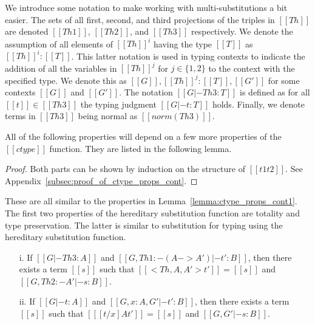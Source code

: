 We introduce some notation to make working with multi-substitutions a
bit easier.  The sets of all first, second, and third projections of
the triples in $[[Th]]$ are denoted $[[Th 1]]$, $[[Th 2]]$, and $[[Th
3]]$ respectively.  We denote the assumption of all elements of
$[[Th]]^i$ having the type $[[T]]$ as $[[Th]]^i : [[T]]$. This latter
notation is used in typing contexts to indicate the addition of all the
variables in $[[Th]]^j$ for $j \in \{1,2\}$ to the context with the
specified type.  We denote this as $[[G]],[[Th]]^j : [[T]],[[G']]$ for
some contexts $[[G]]$ and $[[G']]$.  The notation $[[G |- Th 3 : T]]$
is defined as for all $[[t]] \in [[Th 3]]$ the typing judgment $[[G |-
t : T]]$ holds.  Finally, we denote terms in $[[Th 3]]$ being normal
as $[[norm(Th 3)]]$.

All of the following properties will depend on a few more 
properties of the $[[ctype]]$ function.  They are listed in 
the following lemma.
\begin{proof}
  Both parts can be shown by induction on the structure of $[[t1 t2]]$.  
  See Appendix~\ref{subsec:proof_of_ctype_props_cont}.
\end{proof}
These are all similar to the properties in Lemma~\ref{lemma:ctype_props_cont1}.
The first two properties of the hereditary substitution function are
totality and type preservation.  The latter is similar to substitution
for typing using the hereditary substitution function.
\begin{lemma}
  \label{lemma:totality_and_type_preservation}
  \begin{itemize}
  \item[]
  \item[i.] If $[[G |- Th 3 : A]]$ and $[[G, Th 1:{-(A->A')} |- t' : B]]$, then there
    exists a term $[[s]]$ such that $[[<Th,A,A'>t']] = [[s]]$ and $[[G, Th 2 :{-A'} |- s : B]]$.
  
  \item[ii.] If $[[G |- t : A]]$ and $[[G, x:A, G' |- t':B]]$, then there exists a term $[[s]]$ 
    such that $[[ [t/x] A t']] = [[s]]$ and $[[G,G' |- s:B]]$.
  \end{itemize}
\end{lemma}
